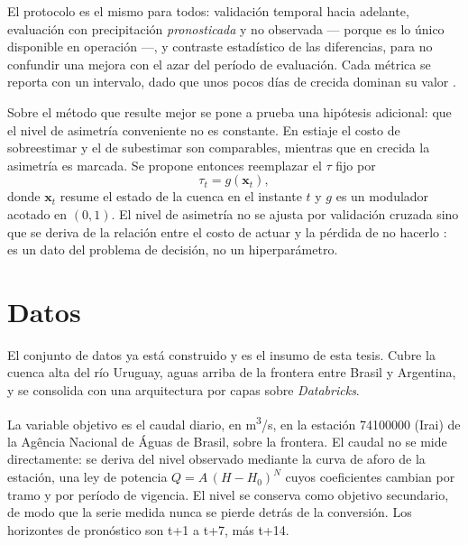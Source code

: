 El protocolo es el mismo para todos: validación temporal hacia adelante, evaluación con
precipitación \emph{pronosticada} y no observada --- porque es lo único disponible en operación
\cite{taccari-2026-aifl} ---, y contraste estadístico de las diferencias, para no confundir una
mejora con el azar del período de evaluación.
Cada métrica se reporta con un intervalo, dado que unos pocos días de crecida dominan su valor
\cite{clark-2021-abuse-performance-metrics}.

Sobre el método que resulte mejor se pone a prueba una hipótesis adicional: que el nivel de
asimetría conveniente no es constante.
En estiaje el costo de sobreestimar y el de subestimar son comparables, mientras que en crecida la
asimetría es marcada.
Se propone entonces reemplazar el $\tau$ fijo por
\begin{equation}
  \tau_t = g(\mathbf{x}_t),
\end{equation}
donde $\mathbf{x}_t$ resume el estado de la cuenca en el instante $t$ y $g$ es un modulador
acotado en $(0,1)$.
El nivel de asimetría no se ajusta por validación cruzada sino que se deriva de la relación entre
el costo de actuar y la pérdida de no hacerlo \cite{matte-2017-beyond-cost-loss}: es
un dato del problema de decisión, no un hiperparámetro.


\section{Datos}

El conjunto de datos ya está construido y es el insumo de esta tesis.
Cubre la cuenca alta del río Uruguay, aguas arriba de la frontera entre Brasil y Argentina, y se
consolida con una arquitectura por capas sobre \textit{Databricks}.

La variable objetivo es el caudal diario, en m\textsuperscript{3}/s, en la estación 74100000 (Irai)
de la Agência Nacional de Águas de Brasil, sobre la frontera.
El caudal no se mide directamente: se deriva del nivel observado mediante la curva de aforo de la
estación, una ley de potencia $Q = A\,(H - H_0)^{N}$ cuyos coeficientes cambian por tramo y por
período de vigencia.
El nivel se conserva como objetivo secundario, de modo que la serie medida nunca se pierde detrás
de la conversión.
Los horizontes de pronóstico son t+1 a t+7, más t+14.

